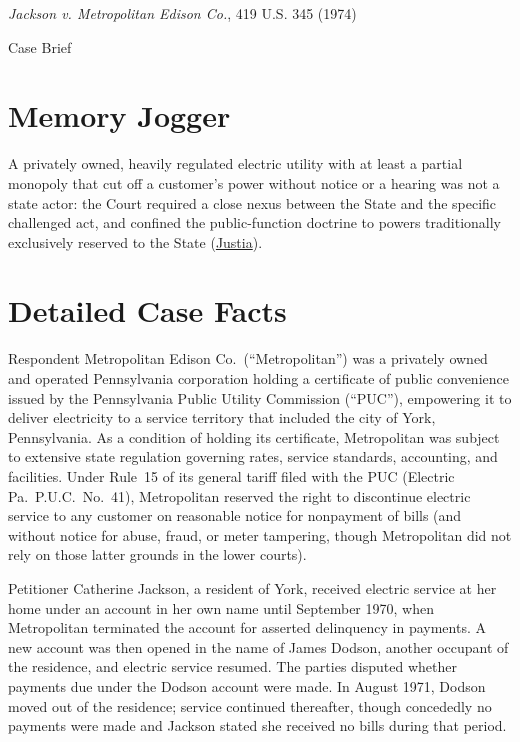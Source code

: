 \documentclass[12pt]{article}
\begin{document}
\begin{center}
{\LARGE \textit{Jackson v. Metropolitan Edison Co.}, 419 U.S. 345 (1974)\par}
\vspace{0.8em}
{\large Case Brief\par}
\end{center}
\vspace{1em}

\section{Memory Jogger}
A privately owned, heavily regulated electric utility with at least a partial monopoly that cut off a customer's power without notice or a hearing was not a state actor: the Court required a close nexus between the State and the specific challenged act, and confined the public-function doctrine to powers traditionally exclusively reserved to the State (\href{https://supreme.justia.com/cases/federal/us/419/345/}{Justia}).

\section{Detailed Case Facts}
Respondent Metropolitan Edison Co.\ (``Metropolitan'') was a privately owned and operated Pennsylvania corporation holding a certificate of public convenience issued by the Pennsylvania Public Utility Commission (``PUC''), empowering it to deliver electricity to a service territory that included the city of York, Pennsylvania. As a condition of holding its certificate, Metropolitan was subject to extensive state regulation governing rates, service standards, accounting, and facilities. Under Rule~15 of its general tariff filed with the PUC (Electric Pa.\ P.U.C.\ No.~41), Metropolitan reserved the right to discontinue electric service to any customer on reasonable notice for nonpayment of bills (and without notice for abuse, fraud, or meter tampering, though Metropolitan did not rely on those latter grounds in the lower courts).

Petitioner Catherine Jackson, a resident of York, received electric service at her home under an account in her own name until September 1970, when Metropolitan terminated the account for asserted delinquency in payments. A new account was then opened in the name of James Dodson, another occupant of the residence, and electric service resumed. The parties disputed whether payments due under the Dodson account were made. In August 1971, Dodson moved out of the residence; service continued thereafter, though concededly no payments were made and Jackson stated she received no bills during that period.
\end{document}
